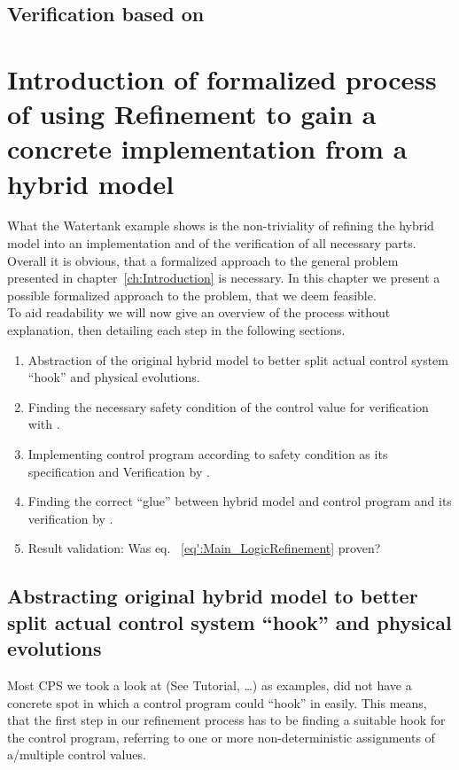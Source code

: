 \section{Verification based on \keym}
\label{sec:Watertank:Verification}

\chapter{Introduction of formalized process of using Refinement to gain a concrete implementation from a hybrid model}
\label{ch:Process}

What the Watertank example shows is the non-triviality of refining the hybrid model into an implementation and of the verification of all necessary parts. Overall it is obvious, that a formalized approach to the general problem presented in chapter~\ref{ch:Introduction} is necessary. In this chapter we present a possible formalized approach to the problem, that we deem feasible.
\\

To aid readability we will now give an overview of the process without explanation, then detailing each step in the following sections. 

\begin{enumerate}
\item Abstraction of the original hybrid model to better split actual control system ``hook'' and physical evolutions.
\item Finding the necessary safety condition of the control value for verification with \keym.
\item Implementing control program according to safety condition as its specification and Verification by \key.
\item Finding the correct ``glue'' between hybrid model and control program and its verification by \keym.
\item Result validation: Was eq. ~\ref{eq':Main_LogicRefinement} proven?
\end{enumerate}

\section{Abstracting original hybrid model to better split actual control system ``hook'' and physical evolutions}
\label{sec:Process:Hook}
Most CPS we took a look at (See \cite{keymaera} Tutorial, \cite[p.~5, p.~11]{platzer2010b} \dots) as examples, did not have a concrete spot in which a control program could ``hook'' in easily. This means, that the first step in our refinement process has to be finding a suitable hook for the control program, referring to one or more non-deterministic assignments of a/multiple control values.

